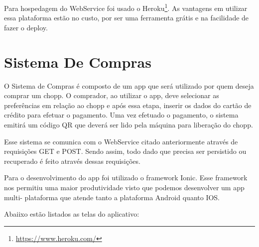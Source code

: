         Para hospedagem do WebService foi usado o Heroku\footnote{\url{https://www.heroku.com/}}.
        As vantagens em utilizar essa plataforma estão no custo, 
        por ser uma ferramenta grátis e na facilidade de fazer o deploy.

    \section[Sistema De Compras]{Sistema De Compras}

    O Sistema de Compras é composto de um app que será utilizado por
    quem deseja comprar um chopp. O comprador, ao utilizar o app, deve selecionar as preferências 
    em relação ao chopp e após essa etapa, inserir os dados do cartão de crédito para efetuar o pagamento. 
    Uma vez efetuado o pagamento, o sistema emitirá um código QR que deverá ser lido pela máquina
    para liberação do chopp.

    Esse sistema se comunica com o WebService citado anteriormente através de
    requisições GET e POST. Sendo assim, todo dado que precisa ser persistido ou recuperado é feito através
    dessas requisições.

    Para o desenvolvimento do app foi utilizado o framework Ionic. Esse framework
    nos permitiu uma maior produtividade visto que podemos desenvolver um app multi-
    plataforma que atende tanto a plataforma Android quanto IOS. 

    Abaiixo estão listados as telas do aplicativo:

